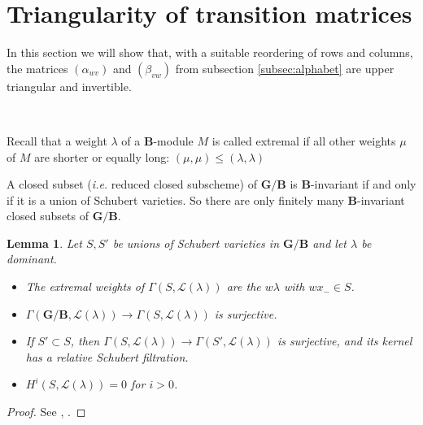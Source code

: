 \documentclass[sn-mathphys-num]{sn-jnl}%
\newcommand{\Ll}{\mathcal L}
\newcommand{\bg}{\mathbf G}
\newcommand{\fb}{\mathbf B}
\newtheorem{lemma}[theorem]{Lemma}
\theoremstyle{definition}
\begin{document}
\section{Triangularity of transition matrices}\label{sec:triangular}

In this section
we will show that, with a suitable reordering of rows and columns, the matrices 
$(\alpha_{wv})$ and $(\beta_{vw})$ from subsection \ref{subsec:alphabet} are upper triangular and invertible. 

\

Recall that a weight $\lambda$ of a $\fb$-module $M$ is called extremal if all other weights $\mu$
of $M$ are shorter or equally long:
$(\mu,\mu)\leq(\lambda,\lambda)$

A  closed subset (\emph{i.e.} reduced closed subscheme) of $\bg/\fb$ is $\fb$-invariant if and only if it is a union of Schubert varieties.
So there are only finitely many $\fb$-invariant  closed subsets of $\bg/\fb$.
\begin{lemma}\label{lem:Schubert module}
    Let $S, S'$ be  unions of Schubert varieties  in $ \bg /{\fb}$ and let $\lambda$ be dominant. 
\begin{itemize}\item The extremal weights of $\Gamma(S,\Ll(\lambda))$ are the $w\lambda$ 
with $wx_-\in S$.
\item  $\Gamma(\bg/\fb,\Ll(\lambda))\to\Gamma(S,\Ll(\lambda))$ is surjective.
\item If $S'\subset S$, then $\Gamma(S,\Ll(\lambda))\to\Gamma(S',\Ll(\lambda))$ is surjective, and its kernel has a relative Schubert filtration.
\item $H^i(S,\Ll(\lambda))=0$ for $i>0$.
\end{itemize}
\end{lemma}
\begin{proof}
    See  \cite[Proposition 2.2.15, Lemma 2.3.10, Lemma 2.2.11,  Proposition A.2.6]{WvdKTata}, \cite[Theorem 1.2.8, Chapter 2]{BK}.
\end{proof}
\end{document}
